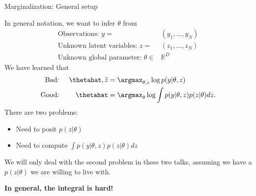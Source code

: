 

\begin{frame}{Marginalization: General setup}

In general notation, we want to infer $\theta$ from
%
\begin{align*}
    \textrm{Observations: }y ={}& (y_1, \ldots, y_N)\\
    \textrm{Unknown latent variables: }z ={}& (z_1, \ldots, z_N)\\
    \textrm{Unknown global parameter: }\theta \in{}& \mathbb{R}^D
\end{align*}
%
We have learned that
%
\begin{align*}
%
\textrm{Bad: }&& \thetahat, \hat{z} ={}& \argmax_{\theta, z} \log p(y | \theta, z)\\
\textrm{Good: }&& \thetahat ={}&
    \argmax_{\theta} \log \int p(y | \theta, z) p(z | \theta) dz.
%
\end{align*}
%
\pause
%
There are two problems:
%
\begin{itemize}
    \item Need to posit $p(z | \theta)$
    \item Need to compute $\int p(y | \theta, z) p(z | \theta) dz$
\end{itemize}
%

We will only deal with the second problem in these two talks, assuming
we have a $p(z | \theta)$ we are willing to live with.

\textbf{In general, the integral is hard!}


\end{frame}





